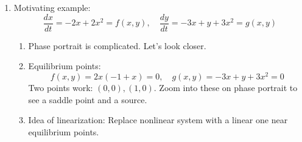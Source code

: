 \documentclass{article}
\begin{document}
\begin{enumerate}

\item Motivating example:
\[
\frac{dx}{dt} = -2x+2x^2 = f(x,y), \quad \frac{dy}{dt}=-3x+y+3x^2 = g(x,y)
\]
\begin{enumerate}
\item Phase portrait is complicated. Let's look closer.
\item Equilibrium points:
\[
f(x,y)=2x(-1+x)=0, \quad g(x,y)=-3x+y+3x^2=0
\]
Two points work: $(0,0), (1,0)$. Zoom into these on phase portrait to see a saddle point and a source.
\item Idea of linearization: Replace nonlinear system with a linear one near equilibrium points.
\end{enumerate}


\end{enumerate}
\end{document}
